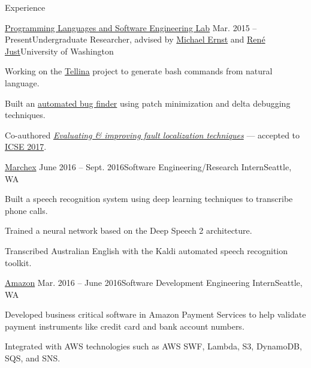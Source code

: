 \documentclass{resume} %
\begin{document}

\begin{rSection}{Experience}

 \begin{rSubsection}{\href{https://uwplse.org/}{Programming Languages and Software Engineering Lab}}
    {Mar. 2015 -- Present}{Undergraduate Researcher, advised by \href{https://homes.cs.washington.edu/~mernst/}{Michael Ernst} and \href{https://people.cs.umass.edu/~rjust/}{Ren{\'e} Just}}{University of Washington}
  \item Working on the \href{https://github.com/TellinaTool}{Tellina} project to generate bash commands from natural language.
  \item Built an \href{https://github.com/dericp/patch-minimization}{automated bug finder} using patch minimization and delta debugging techniques.
  \item Co-authored \href{https://homes.cs.washington.edu/~dericp/resources/fault-localization-tr160803.pdf}{\emph{Evaluating \& improving fault localization techniques}} --- accepted to \href{http://icse2017.gatech.edu/}{ICSE 2017}.
  \end{rSubsection}
  
  \begin{rSubsection}{\href{http://www.marchex.com/}{Marchex}}
    {June 2016 -- Sept. 2016}{Software Engineering/Research Intern}{Seattle, WA}
  \item Built a speech recognition system using deep learning techniques to transcribe phone calls.
  \item Trained a neural network based on the Deep Speech 2 architecture.
  \item Transcribed Australian English with the Kaldi automated speech recognition toolkit.
  \end{rSubsection}

  \begin{rSubsection}{\href{https://www.amazon.com/}{Amazon}}
    {Mar. 2016 -- June 2016}{Software Development Engineering Intern}{Seattle, WA}
  \item Developed business critical software in Amazon Payment Services to help validate payment instruments like credit card and bank account numbers.
  \item Integrated with AWS technologies such as AWS SWF, Lambda, S3, DynamoDB, SQS, and SNS.
  \end{rSubsection}
  

\end{rSection}
\end{document}
